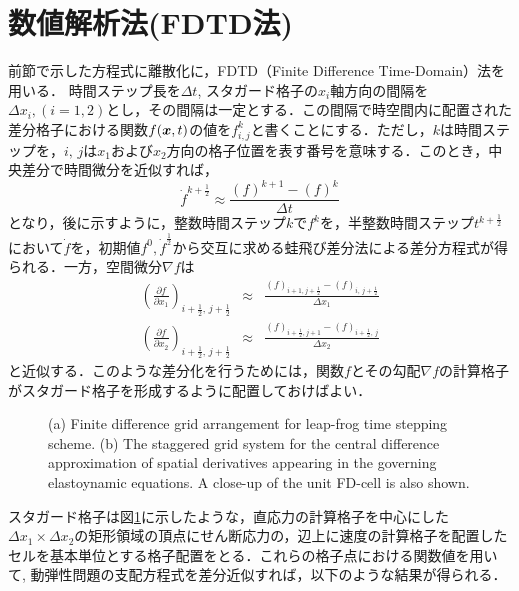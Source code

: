 \section{数値解析法(FDTD法)}
前節で示した方程式に離散化に，FDTD（Finite Difference Time-Domain）法を用いる．
時間ステップ長を$\Delta t$, スタガード格子の$x_i$軸方向の間隔を
$\Delta x_i,(i=1,2)$とし，その間隔は一定とする．この間隔で時空間内に配置された差分格子における関数$f(\mbox{\boldmath $x$},t)$の値を$f^k_{i,j}$と書くことにする．ただし，$k$は時間ステップを，$i,\, j$は$x_1$および$x_2$方向の格子位置を表す番号を意味する．このとき，中央差分で時間微分を近似すれば，
\begin{equation}
	\dot{f}^{k+\frac{1}{2}} \approx \frac{ (f)^{k+1}-(f)^k}{\Delta t}
	\label{eqn:dfdt}
\end{equation}
となり，後に示すように，整数時間ステップ$k$で$f^k$を，半整数時間ステップ$t^{k+\frac{1}{2}}$において$\dot f$を，初期値$f^0, \dot f^{\frac{1}{2}}$から交互に求める蛙飛び差分法による差分方程式が得られる．一方，空間微分$\nabla f$は
\begin{eqnarray}
	\left( \frac{\partial f}{\partial x_1}\right)
	_{i+\frac{1}{2}, \, j+\frac{1}{2}}
	& \approx &
		\frac{\left(f\right)_{i+1,j+\frac{1}{2}} -\left(f\right)_{i,\, j+\frac{1}{2}}}
		{\Delta x_1}
	\label{eqn:dfdx1}
	\\
	\left( \frac{\partial f}{\partial x_2}\right)
	_{i+\frac{1}{2}, \, j+\frac{1}{2}}
	& \approx &
	\frac{\left(f\right)_{i+\frac{1}{2},j+1} -\left(f\right)_{i+\frac{1}{2},\, j}}{\Delta x_2}
	\label{eqn:dfdx2}
\end{eqnarray}
と近似する．このような差分化を行うためには，関数$f$とその勾配$\nabla f$の計算格子がスタガード格子を形成するように配置しておけばよい．
\begin{figure}
     \begin{center}
     \end{center}
     \caption{ (a) Finite difference grid arrangement for leap-frog time stepping scheme.
	 (b) The staggered grid system for the central difference approximation 
		of spatial derivatives appearing in the governing elastoynamic 
		equations. A close-up of the unit FD-cell is also shown.
	}
     \label{fig:FDgrids}
\end{figure}
スタガード格子は図\ref{fig:FDgrids}に示したような，直応力の計算格子を中心にした
$\Delta x_1 \times \Delta x_2$の矩形領域の頂点にせん断応力の，辺上に速度の計算格子を配置したセルを基本単位とする格子配置をとる．これらの格子点における関数値を用いて, 動弾性問題の支配方程式を差分近似すれば，以下のような結果が得られる．
